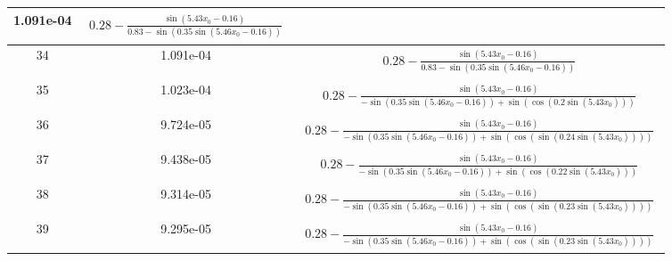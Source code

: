\begin{center}
\begin{tabular}{|c|c|c|}
1.091e-04 & $\begin{aligned}0.28 - \frac{\sin{\left(5.43 x_{0} - 0.16 \right)}}{0.83 - \sin{\left(0.35 \sin{\left(5.46 x_{0} - 0.16 \right)} \right)}}\end{aligned}$\\ \hline34 & 1.091e-04 & $\begin{aligned}0.28 - \frac{\sin{\left(5.43 x_{0} - 0.16 \right)}}{0.83 - \sin{\left(0.35 \sin{\left(5.46 x_{0} - 0.16 \right)} \right)}}\end{aligned}$\\ \hline35 & 1.023e-04 & $\begin{aligned}0.28 - \frac{\sin{\left(5.43 x_{0} - 0.16 \right)}}{- \sin{\left(0.35 \sin{\left(5.46 x_{0} - 0.16 \right)} \right)} + \sin{\left(\cos{\left(0.2 \sin{\left(5.43 x_{0} \right)} \right)} \right)}}\end{aligned}$\\ \hline36 & 9.724e-05 & $\begin{aligned}0.28 - \frac{\sin{\left(5.43 x_{0} - 0.16 \right)}}{- \sin{\left(0.35 \sin{\left(5.46 x_{0} - 0.16 \right)} \right)} + \sin{\left(\cos{\left(\sin{\left(0.24 \sin{\left(5.43 x_{0} \right)} \right)} \right)} \right)}}\end{aligned}$\\ \hline37 & 9.438e-05 & $\begin{aligned}0.28 - \frac{\sin{\left(5.43 x_{0} - 0.16 \right)}}{- \sin{\left(0.35 \sin{\left(5.46 x_{0} - 0.16 \right)} \right)} + \sin{\left(\cos{\left(0.22 \sin{\left(5.43 x_{0} \right)} \right)} \right)}}\end{aligned}$\\ \hline38 & 9.314e-05 & $\begin{aligned}0.28 - \frac{\sin{\left(5.43 x_{0} - 0.16 \right)}}{- \sin{\left(0.35 \sin{\left(5.46 x_{0} - 0.16 \right)} \right)} + \sin{\left(\cos{\left(\sin{\left(0.23 \sin{\left(5.43 x_{0} \right)} \right)} \right)} \right)}}\end{aligned}$\\ \hline39 & 9.295e-05 & $\begin{aligned}0.28 - \frac{\sin{\left(5.43 x_{0} - 0.16 \right)}}{- \sin{\left(0.35 \sin{\left(5.46 x_{0} - 0.16 \right)} \right)} + \sin{\left(\cos{\left(\sin{\left(0.23 \sin{\left(5.43 x_{0} \right)} \right)} \right)} \right)}}\end{aligned}$\\ \hline\end{tabular}
        \end{center}
        